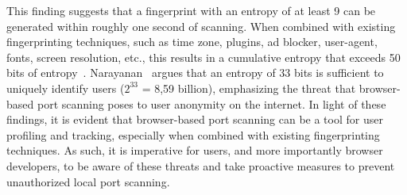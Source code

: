 This finding suggests that a fingerprint with an entropy of at least 9 can be generated within roughly one second of scanning. When combined with existing fingerprinting techniques, such as time zone, plugins, ad blocker, user-agent, fonts, screen resolution, etc., this results in a cumulative entropy that exceeds 50 bits of entropy~. Narayanan~ argues that an entropy of 33 bits is sufficient to uniquely identify users ($2^{33}$ = 8,59 billion), emphasizing the threat that browser-based port scanning poses to user anonymity on the internet.
In light of these findings, it is evident that browser-based port scanning can be a tool for user profiling and tracking, especially when combined with existing fingerprinting techniques. As such, it is imperative for users, and more importantly browser developers, to be aware of these threats and take proactive measures to prevent unauthorized local port scanning.







  
  








